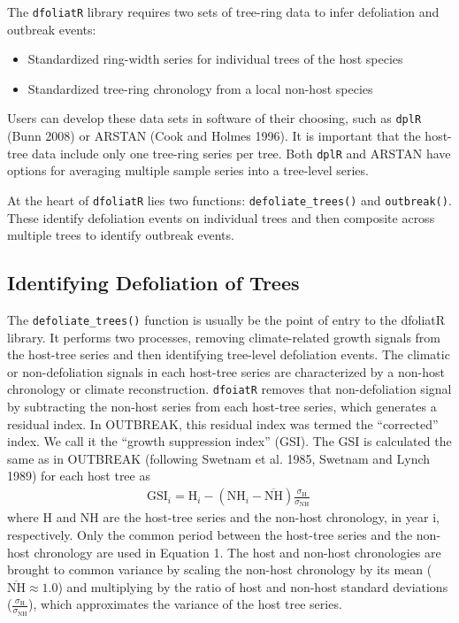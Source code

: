 \documentclass[review]{elsarticle} %
\providecommand{\tightlist}{%
  \setlength{\itemsep}{0pt}\setlength{\parskip}{0pt}}
\begin{document}
The \texttt{dfoliatR} library requires two sets of tree-ring data to
infer defoliation and outbreak events:

\begin{itemize}
\tightlist
\item
  Standardized ring-width series for individual trees of the host
  species
\item
  Standardized tree-ring chronology from a local non-host species
\end{itemize}

Users can develop these data sets in software of their choosing, such as
\texttt{dplR} (Bunn 2008) or ARSTAN (Cook and Holmes 1996). It is
important that the host-tree data include only one tree-ring series per
tree. Both \texttt{dplR} and ARSTAN have options for averaging multiple
sample series into a tree-level series.

At the heart of \texttt{dfoliatR} lies two functions:
\texttt{defoliate\_trees()} and \texttt{outbreak()}. These identify
defoliation events on individual trees and then composite across
multiple trees to identify outbreak events.

\hypertarget{identifying-defoliation-of-trees}{%
\subsection{Identifying Defoliation of
Trees}\label{identifying-defoliation-of-trees}}

The \texttt{defoliate\_trees()} function is usually be the point of
entry to the dfoliatR library. It performs two processes, removing
climate-related growth signals from the host-tree series and then
identifying tree-level defoliation events. The climatic or
non-defoliation signals in each host-tree series are characterized by a
non-host chronology or climate reconstruction. \texttt{dfoiatR} removes
that non-defoliation signal by subtracting the non-host series from each
host-tree series, which generates a residual index. In OUTBREAK, this
residual index was termed the ``corrected'' index. We call it the
``growth suppression index'' (GSI). The GSI is calculated the same as in
OUTBREAK (following Swetnam et al. 1985, Swetnam and Lynch 1989) for
each host tree as \begin{align}
\textrm{GSI}_{i} = \textrm{H}_{i} - \left( \textrm{NH}_{i} - \overline{\textrm{NH}} \right) \frac{\sigma_{\textrm{H}}}{\sigma_{\textrm{NH}}} \
\end{align} where H and NH are the host-tree series and the non-host
chronology, in year i, respectively. Only the common period between the
host-tree series and the non-host chronology are used in Equation 1. The
host and non-host chronologies are brought to common variance by scaling
the non-host chronology by its mean
(\(\overline{\textrm{NH}} \approx 1.0\)) and multiplying by the ratio of
host and non-host standard deviations
(\(\frac{\sigma_{\textrm{H}}}{\sigma_{\textrm{NH}}}\)), which
approximates the variance of the host tree series.
\end{document}
